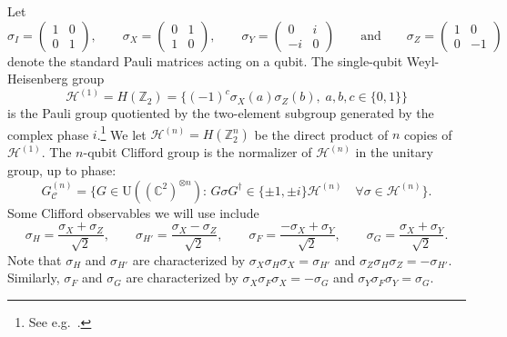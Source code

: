 \documentclass[11pt]{article}
\theoremstyle{remark}
\theoremstyle{definition}
\newcommand{\Id}{\ensuremath{\mathop{\rm Id}\nolimits}}
\newcommand{\C}{\ensuremath{\mathbb{C}}}
\newcommand{\Z}{\ensuremath{\mathbb{Z}}}
\newcommand{\setft}[1]{\mathrm{#1}}
\newcommand{\Unitary}{\setft{U}}
\newcommand{\heisg}{{\mathcal{H}^{(1)}}}
\newcommand{\heisgn}{{\mathcal{H}^{(n)}}}
\newcommand{\cliffordn}{G_\mathcal{C}^{(n)}}
\newcommand{\paulign}{G_{\mathcal{P}}^{(n)}}
\begin{document}
Let 
\begin{equation}\label{eq:pauli-matrix}
\sigma_I = \begin{pmatrix} 1 & 0 \\ 0 & 1 \end{pmatrix},\qquad \sigma_X = \begin{pmatrix} 0 & 1 \\ 1 & 0 \end{pmatrix},\qquad \sigma_Y = \begin{pmatrix} 0 & i \\ -i & 0 \end{pmatrix}\qquad\text{and}\qquad \sigma_Z = \begin{pmatrix} 1 & 0 \\ 0 & -1\end{pmatrix}
\end{equation}
denote the standard Pauli matrices acting on a qubit. The single-qubit Weyl-Heisenberg group
$$\heisg = H(\Z_2)=\Big\{(-1)^c\sigma_X(a)\sigma_Z(b),\;a,b,c\in\{0,1\}\Big\} $$
is the Pauli group quotiented by the two-element subgroup generated by the complex phase $i$.\footnote{See e.g.~\cite[Section II.A]{gross2006hudson}.} We  let $\heisgn = H(\Z_2^n)$ be the direct product of $n$ copies of $\heisg$.  
The $n$-qubit Clifford group is the normalizer of $\heisgn$ in the unitary group, up to phase: 
$$\cliffordn = \big\{G\in\Unitary((\C^2)^{\otimes n}):\, G \sigma G^\dagger \in \{\pm 1,\pm i\}\heisgn \quad\forall \sigma \in \heisgn\big\}.$$
Some Clifford observables we will use include 
$$ \sigma_H = \frac{\sigma_X+\sigma_Z}{\sqrt{2}},\qquad \sigma_{H'} = \frac{\sigma_X-\sigma_Z}{\sqrt{2}},\qquad \sigma_F = \frac{-\sigma_X+\sigma_Y}{\sqrt{2}},\qquad \sigma_{G} = \frac{\sigma_X+\sigma_Y}{\sqrt{2}}.$$
Note that  $\sigma_H$ and $\sigma_{H'}$ are characterized by $\sigma_X \sigma_H \sigma_X = \sigma_{H'}$ and $\sigma_Z \sigma_H \sigma_Z = -\sigma_{H'}$. Similarly, $\sigma_F$ and $\sigma_G$ are characterized by $\sigma_X \sigma_F \sigma_X = -\sigma_G$ and $\sigma_Y \sigma_F \sigma_Y = \sigma_G$. 
\end{document}

